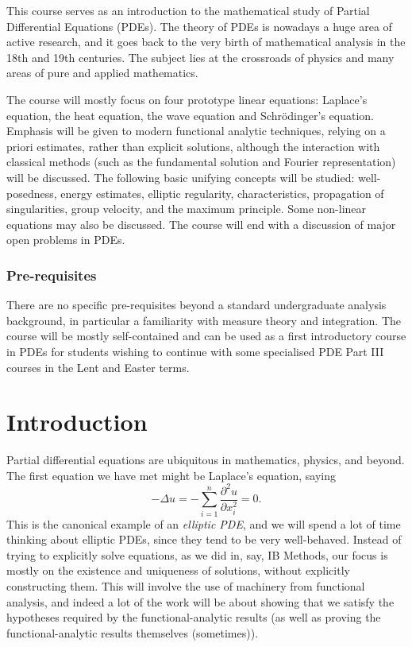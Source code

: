 \documentclass[a4paper]{article}
\begin{document}
\maketitle
{\small
\setlength{\parindent}{0em}
\setlength{\parskip}{1em}

This course serves as an introduction to the mathematical study of Partial Differential Equations (PDEs). The theory of PDEs is nowadays a huge area of active research, and it goes back to the very birth of mathematical analysis in the 18th and 19th centuries. The subject lies at the crossroads of physics and many areas of pure and applied mathematics.

The course will mostly focus on four prototype linear equations: Laplace's equation, the heat equation, the wave equation and Schr\"odinger's equation. Emphasis will be given to modern functional analytic techniques, relying on a priori estimates, rather than explicit solutions, although the interaction with classical methods (such as the fundamental solution and Fourier representation) will be discussed. The following basic unifying concepts will be studied: well-posedness, energy estimates, elliptic regularity, characteristics, propagation of singularities, group velocity, and the maximum principle. Some non-linear equations may also be discussed. The course will end with a discussion of major open problems in PDEs.

\subsubsection*{Pre-requisites}
There are no specific pre-requisites beyond a standard undergraduate analysis background, in particular a familiarity with measure theory and integration. The course will be mostly self-contained and can be used as a first introductory course in PDEs for students wishing to continue with some specialised PDE Part III courses in the Lent and Easter terms.
}
\tableofcontents

\setcounter{section}{-1}
\section{Introduction}
Partial differential equations are ubiquitous in mathematics, physics, and beyond. The first equation we have met might be Laplace's equation, saying
\[
  -\Delta u = -\sum_{i = 1}^n \frac{\partial^2 u}{\partial x_i^2} = 0.
\]
This is the canonical example of an \emph{elliptic PDE}, and we will spend a lot of time thinking about elliptic PDEs, since they tend to be very well-behaved. Instead of trying to explicitly solve equations, as we did in, say, IB Methods, our focus is mostly on the existence and uniqueness of solutions, without explicitly constructing them. This will involve the use of machinery from functional analysis, and indeed a lot of the work will be about showing that we satisfy the hypotheses required by the functional-analytic results (as well as proving the functional-analytic results themselves (sometimes)).
\end{document}
